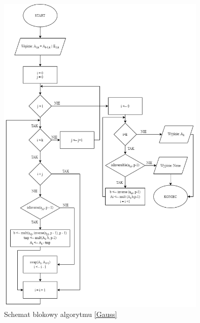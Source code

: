 \documentclass[]{article}
\begin{document}
				
	\begin{figure}[H]
		\begin{center}
		\includegraphics[width = 10cm]{alg9.png} \caption{Schemat blokowy algorytmu \ref{Gauss}}
		\end{center}
	\end{figure}

	
	
\end{document}
